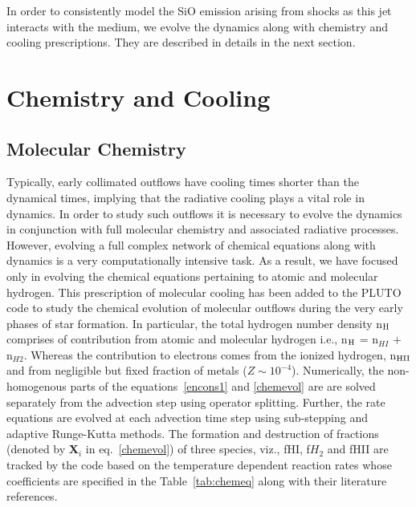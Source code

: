 \documentclass[useAMS,usenatbib]{mn2e}
\begin{document}
In order to consistently model the SiO emission arising from shocks as
this jet interacts with the medium, we evolve the dynamics along with
chemistry and cooling prescriptions. They are described in details in
the next section.

\section{Chemistry and Cooling}
\label{sec:chem}
\subsection{Molecular Chemistry}
\label{ssec:molcool}
Typically, early collimated outflows have cooling times shorter than
the dynamical times, implying that the radiative cooling plays a vital
role in dynamics. In order to study such outflows it is necessary to evolve
the dynamics in conjunction with full molecular chemistry and
associated radiative processes. However, evolving a full complex
network of chemical equations along with dynamics is a very
computationally intensive task. As a result, we have focused only in
evolving the chemical equations pertaining to atomic and molecular
hydrogen. This prescription of molecular cooling has been added to the PLUTO
code to study the chemical evolution of molecular outflows during the
very early phases of star formation. In particular, the total hydrogen
number density n$_{\rm H}$ comprises of contribution from atomic and
molecular hydrogen i.e., n$_{\rm H}$ = n$_{HI}$ + n$_{H2}$. Whereas
the contribution to electrons comes from the ionized hydrogen, n$_{\rm HII}$ and
from negligible but fixed fraction of metals ($Z \sim 10^{-4}$).
%
Numerically, the
non-homogenous parts of the equations~\ref{encons1} and \ref{chemevol} 
are are solved separately from the advection step
using operator splitting. Further, the rate equations are evolved at each advection time
step using sub-stepping and adaptive Runge-Kutta methods.
The formation and destruction of
fractions (denoted by \textbf{X}$_{i}$ in eq.~\ref{chemevol}) of three species, viz., fHI, f$H_{2}$
and fHII are tracked by the code based on the temperature dependent reaction rates
whose coefficients are specified 
in the Table~\ref{tab:chemeq} along with their literature references. 

\end{document}
